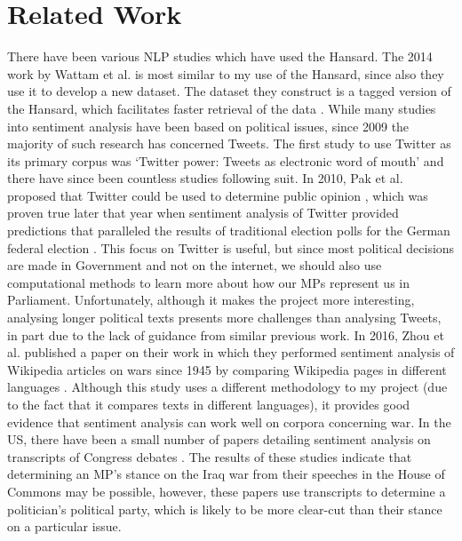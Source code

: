 \documentclass[12pt,a4paper,twoside,openright]{report}
\begin{document}
\section{Related Work} \label{intro-related}
There have been various NLP studies which have used the Hansard. The 2014 work by Wattam et al. is most similar to my use of the Hansard, since also they use it to develop a new dataset. The dataset they construct is a tagged version of the Hansard, which facilitates faster retrieval of the data \cite{hansardtagging}.
\newline
While many studies into sentiment analysis have been based on political issues, since 2009 the majority of such research has concerned Tweets. The first study to use Twitter as its primary corpus was `Twitter power: Tweets as electronic word of mouth' \cite{first_twitter} and there have since been countless studies following suit. In 2010, Pak et al. proposed that Twitter could be used to determine public opinion \cite{twitter_as_a_corpus}, which was proven true later that year when sentiment analysis of Twitter provided predictions that paralleled the results of traditional election polls for the German federal election \cite{predicting_elections_twitter}. This focus on Twitter is useful, but since most political decisions are made in Government and not on the internet, we should also use computational methods to learn more about how our MPs represent us in Parliament. Unfortunately, although it makes the project more interesting, analysing longer political texts presents more challenges than analysing Tweets, in part due to the lack of guidance from similar previous work.
\newline
In 2016, Zhou et al. published a paper on their work in which they performed sentiment analysis of Wikipedia articles on wars since 1945 by comparing Wikipedia pages in different languages \cite{wikipediawar}. Although this study uses a different methodology to my project (due to the fact that it compares texts in different languages), it provides good evidence that sentiment analysis can work well on corpora concerning war.
\newline
In the US, there have been a small number of papers detailing sentiment analysis on transcripts of Congress debates \cite{rep_dem_one, rep_dem_two}. The results of these studies indicate that determining an MP's stance on the Iraq war from their speeches in the House of Commons may be possible, however, these papers use transcripts to determine a politician's political party, which is likely to be more clear-cut than their stance on a particular issue.
\newline
\newline
\end{document}
